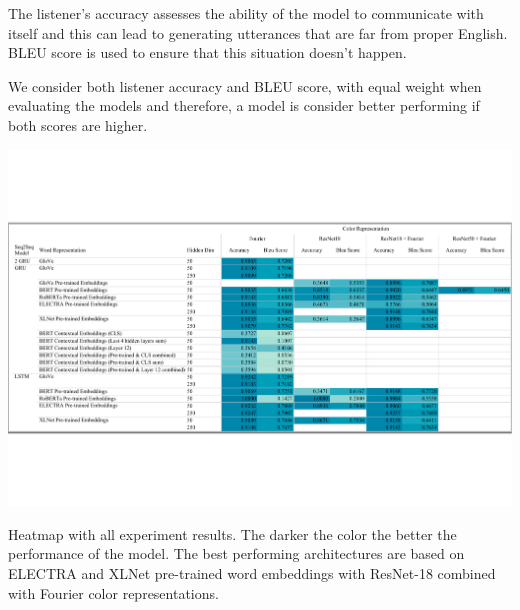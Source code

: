\par
The listener's accuracy assesses the ability of the model to communicate with itself and this can lead to generating utterances that are far from proper English. BLEU score is used to ensure that this situation doesn’t happen.

\par
We consider both listener accuracy and BLEU score, with equal weight when evaluating the models and therefore, a model is consider better performing if both scores are higher.

\begin{table}[ht]
\centering
\includegraphics[width=\textwidth]{assets/heatmap.pdf}
\caption[Heatmap]{Heatmap with all experiment results. The darker the color the better the performance of the model. The best performing architectures are based on ELECTRA and XLNet pre-trained word embeddings with ResNet-18 combined with Fourier color representations.}
\label{table:heatmap}
\end{table}


